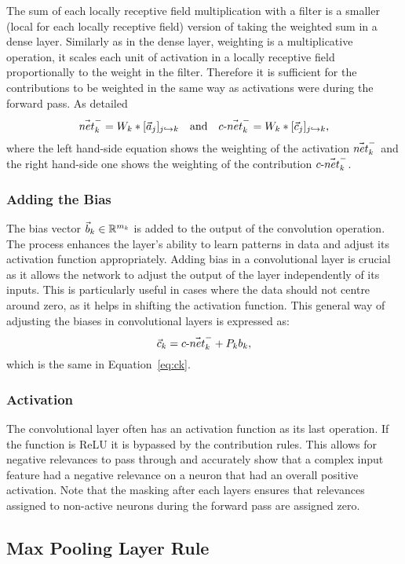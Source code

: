 The sum of each locally receptive field multiplication with a filter is a smaller (local for each locally receptive field) version of taking the weighted sum in a dense layer. Similarly as in the dense layer, weighting is a multiplicative operation, it scales each unit of activation in a locally receptive field proportionally to the weight in the filter. Therefore it is sufficient for the contributions to be
weighted in the same way as activations were during the forward pass. As detailed
\begin{equation}
    \vec{net}_{k}^- = W_k\ast[\vec{a}_j]_{j\hookrightarrow k}\quad\mbox{and}\quad
   \text{$c$-}\vec{net}_{k}^- = W_k\ast[\vec{c}_j]_{j\hookrightarrow k},
\label{eq:conv_cnet}   
\end{equation}
where the left hand-side equation shows the weighting of the activation $\vec{net}_{k}^-$ and the right hand-side one shows the weighting of the contribution $\text{$c$-}\vec{net}_{k}^-$.
\subsubsection{Adding the Bias}

The bias vector \(\vec{b}_k \in \mathbb{R}^{m_k}\) is added to the output of the convolution operation. The process enhances the layer’s ability to learn patterns in data and adjust its activation function appropriately. Adding bias in a convolutional layer is crucial as it allows the network to adjust the output of the layer independently of its inputs. This is particularly useful in cases where the data should not centre around zero, as it helps in shifting the activation function. This general way of adjusting the biases in convolutional layers is expressed as:
\begin{equation}
   \vec{c}_k =\text{$c$-}\vec{net}_{k}^- +  P_{k}{b}_k, 
\end{equation} 
which is the same in Equation~\ref{eq:ck}.
\subsubsection{Activation}
The convolutional layer often has an activation function as its last operation. If the function is ReLU it is bypassed by the contribution rules. This allows for negative relevances to pass through and accurately show that a complex input feature had a negative relevance on a neuron that had an overall positive activation. Note that the masking after each layers ensures that relevances assigned to non-active neurons during the forward pass are assigned zero.  


\subsection{Max Pooling Layer Rule}

